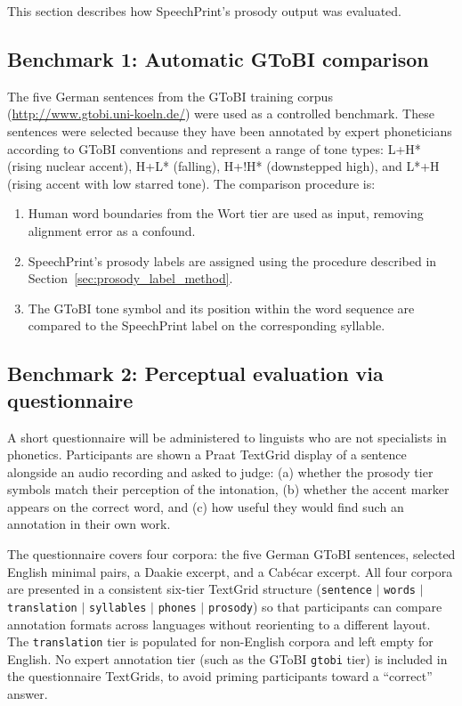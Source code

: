 This section describes how SpeechPrint's prosody output was evaluated.

\subsection{Benchmark 1: Automatic GToBI comparison}

The five German sentences from the GToBI training corpus
(\url{http://www.gtobi.uni-koeln.de/}) were used as a controlled benchmark.
These sentences were selected because they have been annotated by expert
phoneticians according to GToBI conventions and represent a range of tone types:
L+H* (rising nuclear accent), H+L* (falling), H+!H* (downstepped high), and
L*+H (rising accent with low starred tone). The comparison procedure is:
\begin{enumerate}
\item Human word boundaries from the Wort tier are used as input, removing
      alignment error as a confound.
\item SpeechPrint's prosody labels are assigned using the procedure described
      in Section~\ref{sec:prosody_label_method}.
\item The GToBI tone symbol and its position within the word sequence are
      compared to the SpeechPrint label on the corresponding syllable.
\end{enumerate}

\subsection{Benchmark 2: Perceptual evaluation via questionnaire}

A short questionnaire will be administered to linguists who are not specialists
in phonetics. Participants are shown a Praat TextGrid display of a sentence
alongside an audio recording and asked to judge: (a) whether the prosody tier
symbols match their perception of the intonation, (b) whether the accent marker
appears on the correct word, and (c) how useful they would find such an
annotation in their own work.

The questionnaire covers four corpora: the five German GToBI sentences,
selected English minimal pairs, a Daakie excerpt, and a Cabécar excerpt.
All four corpora are presented in a consistent six-tier TextGrid structure
(\texttt{sentence} $|$ \texttt{words} $|$ \texttt{translation} $|$
\texttt{syllables} $|$ \texttt{phones} $|$ \texttt{prosody}) so that
participants can compare annotation formats across languages without
reorienting to a different layout. The \texttt{translation} tier is populated
for non-English corpora and left empty for English. No expert annotation tier
(such as the GToBI \texttt{gtobi} tier) is included in the questionnaire
TextGrids, to avoid priming participants toward a ``correct'' answer.

